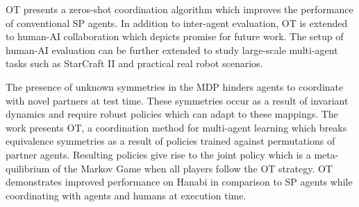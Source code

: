 \documentclass[11pt,letterpaper]{article}
\begin{document}
OT presents a zeros-shot coordination algorithm which improves the performance of conventional SP agents. In addition to inter-agent evaluation, OT is extended to human-AI collaboration which depicts promise for future work. The setup of human-AI evaluation can be further extended to study large-scale multi-agent tasks such as StarCraft II and practical real robot scenarios. 

The presence of unknown symmetries in the MDP hinders agents to coordinate with novel partners at test time. These symmetries occur as a result of invariant dynamics and require robust policies which can adapt to these mappings. The work presents OT, a coordination method for multi-agent learning which breaks equivalence symmetries as a result of policies trained against permutations of partner agents. Resulting policies give rise to the joint policy which is a meta-quilibrium of the Markov Game when all players follow the OT strategy. OT demonstrates improved performance on Hanabi in comparison to SP agents while coordinating with agents and humans at execution time. 
\end{document}
